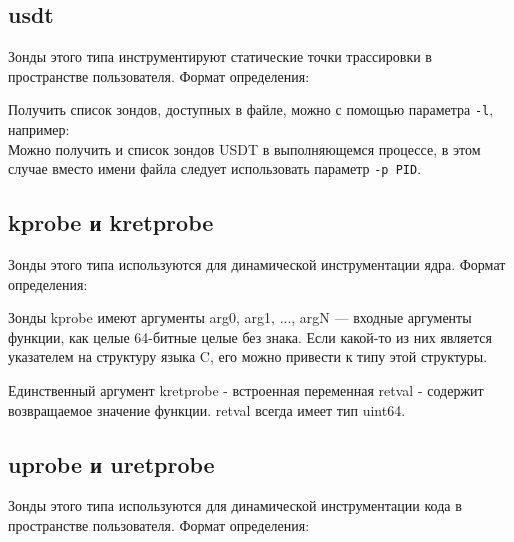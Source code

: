 
\subsection{usdt}
Зонды этого типа инструментируют статические точки трассировки в пространстве
пользователя. Формат определения: \\

\noindent Получить список зондов, доступных в файле, можно с помощью параметра \texttt{-l}, например: \\
Можно получить и список зондов USDT в выполняющемся процессе, в этом случае
вместо имени файла следует использовать параметр \texttt{-p PID}.

\subsection{kprobe и kretprobe}
Зонды этого типа используются для динамической инструментации ядра. Формат
определения: \\

Зонды kprobe имеют аргументы arg0, arg1, ..., argN — входные аргументы функции,
как целые 64-битные целые без знака. Если какой-то из них является указателем
на структуру языка C, его можно привести к типу этой структуры.

Единственный аргумент kretprobe - встроенная переменная retval - содержит 
возвращаемое значение функции. retval всегда имеет тип uint64.

\subsection{uprobe и uretprobe}
Зонды этого типа используются для динамической инструментации кода в пространстве пользователя. Формат определения: \\

